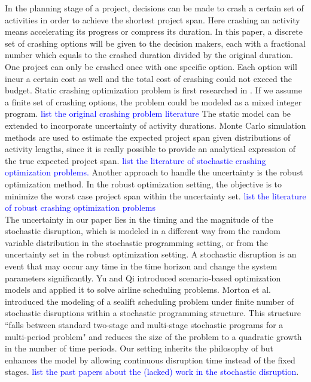 \documentclass[11pt]{article}
\begin{document}
	In the planning stage of a project, decisions can be made to crash a certain set of activities in order to achieve the shortest project span. Here crashing an activity means accelerating its progress or compress its duration. In this paper, a discrete set of crashing options will be given to the decision makers, each with a fractional number which equals to the crashed duration divided by the original duration. One project can only be crashed once with one specific option. Each option will incur a certain cost as well and the total cost of crashing could not exceed the budget. Static crashing optimization problem is first researched in \cite{fulkerson1961network, kelley1961criticalpath}. If we assume a finite set of crashing options, the problem could be modeled as a mixed integer program. \textcolor{blue}{list the original crashing problem literature} The static model can be extended to incorporate uncertainty of activity durations. Monte Carlo simulation methods are used to estimate the expected project span given distributions of activity lengths, since it is really possible to provide an analytical expression of the true expected project span. \textcolor{blue}{list the literature of stochastic crashing optimization problems.} Another approach to handle the uncertainty is the robust optimization method. In the robust optimization setting, the objective is to minimize the worst case project span within the uncertainty set. \textcolor{blue}{list the literature of robust crashing optimization problems}\\
	\newline
	The uncertainty in our paper lies in the timing and the magnitude of the stochastic disruption, which is modeled in a different way from the random variable distribution in the stochastic programming setting, or from the uncertainty set in the robust optimization setting. A stochastic disruption is an event that may occur any time in the time horizon and change the system parameters significantly. Yu and Qi \cite{yu2004disruptionmgt} introduced scenario-based optimization models and applied it to solve airline scheduling problems. Morton et al. \cite{morton2009sealift} introduced the modeling of a sealift scheduling problem under finite number of stochastic disruptions within a stochastic programming structure. This structure ``falls between standard two-stage and multi-stage stochastic programs for a multi-period problem" and reduces the size of the problem to a quadratic growth in the number of time periods. Our setting inherits the philosophy of \cite{morton2009sealift} but enhances the model by allowing continuous disruption time instead of the fixed stages. \textcolor{blue}{list the past papers about the (lacked) work in the stochastic disruption}.\\
\end{document}

